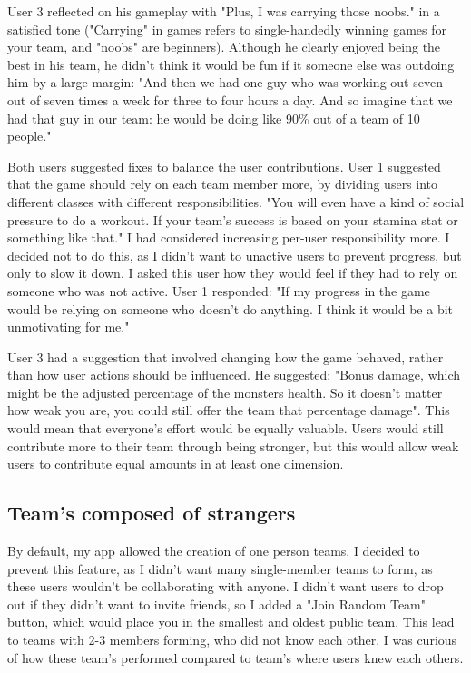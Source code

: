 \documentclass{l4proj}
\begin{document}
User 3 reflected on his gameplay with "Plus, I was carrying those noobs." in a satisfied tone ("Carrying" in games refers to single-handedly winning games for your team, and "noobs" are beginners). Although he clearly enjoyed being the best in his team, he didn't think it would be fun if it someone else was outdoing him by a large margin: "And then we had one guy who was working out seven out of seven times a week for three to four hours a day. And so imagine that we had that guy in our team: he would be doing like 90\% out of a team of 10 people." 

Both users suggested fixes to balance the user contributions. User 1 suggested that the game should rely on each team member more, by dividing users into different classes with different responsibilities. "You will even have a kind of social pressure to do a workout. If your team's success is based on your stamina stat or something like that." I had considered increasing per-user responsibility more. I decided not to do this, as I didn't want to unactive users to prevent progress, but only to slow it down. I asked this user how they would feel if they had to rely on someone who was not active. User 1 responded: "If my progress in the game would be relying on someone who doesn't do anything. I think it would be a bit unmotivating for me." 

User 3 had a suggestion that involved changing how the game behaved, rather than how user actions should be influenced. He suggested: "Bonus damage, which might be the adjusted percentage of the monsters health. So it doesn't matter how weak you are, you could still offer the team that percentage damage". This would mean that everyone's effort would be equally valuable. Users would still contribute more to their team through being stronger, but this would allow weak users to contribute equal amounts in at least one dimension. 


\subsection{Team's composed of strangers}
By default, my app allowed the creation of one person teams. I decided to prevent this feature, as I didn't want many single-member teams to form, as these users wouldn't be collaborating with anyone. I didn't want users to drop out if they didn't want to invite friends, so I added a "Join Random Team" button, which would place you in the smallest and oldest public team. This lead to teams with 2-3 members forming, who did not know each other. I was curious of how these team's performed compared to team's where users knew each others.
\end{document}
